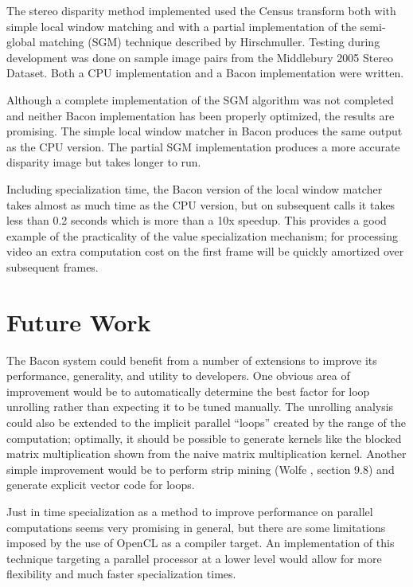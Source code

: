 \documentclass{llncs}
\begin{document}
The stereo disparity method implemented used the Census
transform\cite{zabih:1994} both with simple local window matching and
with a partial implementation of the semi-global matching (SGM) technique
described by Hirschmuller\cite{hirschmuller:2005}. Testing during
development was done on sample image pairs from the Middlebury 2005
Stereo Dataset\cite{hirschmuller:2005}. Both a CPU implementation and
a Bacon implementation were written.

Although a complete implementation of the SGM algorithm was not
completed and neither Bacon implementation has been properly
optimized, the results are promising. The simple local window matcher
in Bacon produces the same output as the CPU version. The partial SGM
implementation produces a more accurate disparity image but takes
longer to run.

Including specialization time, the Bacon version of the local window
matcher takes almost as much time as the CPU version, but on
subsequent calls it takes less than 0.2 seconds which is more than a
10x speedup. This provides a good example of the practicality of the
value specialization mechanism; for processing video an extra
computation cost on the first frame will be quickly amortized over
subsequent frames.

\section{Future Work}

The Bacon system could benefit from a number of extensions to improve
its performance, generality, and utility to developers. One obvious
area of improvement would be to automatically determine the best
factor for loop unrolling rather than expecting it to be tuned
manually. The unrolling analysis could also be extended to the
implicit parallel ``loops'' created by the range of the computation;
optimally, it should be possible to generate kernels like the blocked
matrix multiplication shown from the naive matrix multiplication
kernel. Another simple improvement would be to perform strip mining
(Wolfe \cite{wolfe:1996}, section 9.8) and generate explicit vector
code for loops.

Just in time specialization as a method to improve performance on
parallel computations seems very promising in general, but there are
some limitations imposed by the use of OpenCL as a compiler target. An
implementation of this technique targeting a parallel processor at a
lower level would allow for more flexibility and much faster
specialization times.
\end{document}
